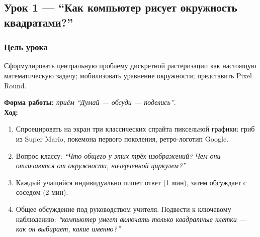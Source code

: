 \documentclass[12pt,a4paper]{scrartcl}
\newcommand{\vrema}[1]{\textnormal{\footnotesize\color{bg!90!white}\textsf{#1}}}
\begin{document}
\subsection{Урок 1 --- ``Как компьютер рисует окружность квадратами?''}\label{urok1}

\subsubsection*{Цель урока}
Сформулировать центральную проблему дискретной растеризации как настоящую математическую задачу; мобилизовать уравнение окружности; представить Pixel Round.

\medskip

\begin{zadanie}[1.1 --- Мотивация \quad\vrema{8 мин}]
\textbf{Форма работы:} \emph{приём ``Думай --- обсуди --- поделись''}. \\[0.4em]
\textbf{Ход:}
\begin{enumerate}[leftmargin=1.5em,itemsep=0.2em,topsep=0.3em,nosep]
  \item Спроецировать на экран три классических спрайта пиксельной графики: гриб из Super Mario, покемона первого поколения, ретро-логотип Google.
  \item Вопрос классу: \emph{``Что общего у этих трёх изображений? Чем они отличаются от окружности, начерченной циркулем?''}
  \item Каждый учащийся индивидуально пишет ответ (1 мин), затем обсуждает с соседом (2 мин).
  \item Общее обсуждение под руководством учителя. Подвести к ключевому наблюдению: \emph{``компьютер умеет включать только квадратные клетки --- как он выбирает, какие именно?''}
\end{enumerate}
\end{zadanie}
\end{document}
